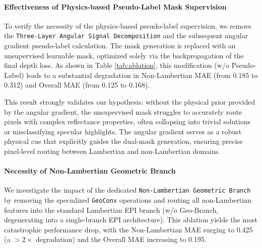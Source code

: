 \documentclass[lettersize,journal]{IEEEtran}
\begin{document}
\begin{table}[!t]
\caption{Ablation Study of Key Modules in the Proposed Unified Dual-Mask Physical Model. Lower is better for all metrics.}
\label{tab:ablation}
\centering
{}
\end{table}

\paragraph{Effectiveness of Physics-based Pseudo-Label Mask Supervision}
To verify the necessity of the physics-based pseudo-label supervision, we remove the \texttt{Three-Layer Angular Signal Decomposition} and the subsequent angular gradient pseudo-label calculation. The mask generation is replaced with an unsupervised learnable mask, optimized solely via the backpropagation of the final depth loss. As shown in Table \ref{tab:ablation}, this modification (w/o Pseudo-Label) leads to a substantial degradation in Non-Lambertian MAE (from 0.185 to 0.312) and Overall MAE (from 0.125 to 0.168). 

This result strongly validates our hypothesis: without the physical prior provided by the angular gradient, the unsupervised mask struggles to accurately route pixels with complex reflectance properties, often collapsing into trivial solutions or misclassifying specular highlights. The angular gradient serves as a robust physical cue that explicitly guides the dual-mask generation, ensuring precise pixel-level routing between Lambertian and non-Lambertian domains.

\paragraph{Necessity of Non-Lambertian Geometric Branch}
We investigate the impact of the dedicated \texttt{Non-Lambertian Geometric Branch} by removing the specialized \texttt{GeoConv} operations and routing all non-Lambertian features into the standard Lambertian EPI branch (w/o Geo-Branch, degenerating into a single-branch EPI architecture). This ablation yields the most catastrophic performance drop, with the Non-Lambertian MAE surging to 0.425 (a $>2\times$ degradation) and the Overall MAE increasing to 0.195. 
\end{document}
